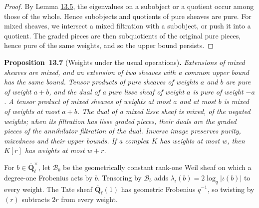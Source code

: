 \documentclass[11pt]{article}
\newenvironment{bpstatement}[2]{\par\addvspace{0.6\baselineskip}\noindent\textbf{#1}#2\textbf{.}\enspace\ignorespaces}
  {\par\addvspace{0.4\baselineskip}}
\newenvironment{bpstatementit}[2]{\begin{bpstatement}{#1}{#2}\itshape\ignorespaces}{\end{bpstatement}}
\begin{document}
\begin{proof}[{Proof}]\label{bp21}%
By Lemma \hyperref[bp17]{13.5}, the eigenvalues on a subobject or a quotient occur among those of the whole. Hence subobjects and quotients of pure sheaves are pure. For mixed sheaves, we intersect a mixed filtration with a subobject, or push it into a quotient. The graded pieces are then subquotients of the original pure pieces, hence pure of the same weights, and so the upper bound persists.
\end{proof}

\label{bp22}%
\begin{bpstatementit}{Proposition~13.7}{ (Weights under the usual operations)}
Extensions of mixed sheaves are mixed, and an extension of two sheaves with a common upper bound has the same bound.  Tensor products of pure sheaves of weights \(a\) and \(b\) are pure of weight \(a+b\), and the dual of a pure lisse sheaf of weight \(a\) is pure of weight \(-a\). A tensor product of mixed sheaves of weights at most \(a\) and at most \(b\) is mixed of weights at most \(a+b\). The dual of a mixed lisse sheaf is mixed, of the negated weights; when its filtration has lisse graded pieces, their duals are the graded pieces of the annihilator filtration of the dual.  Inverse image preserves purity, mixedness and their upper bounds.  If a complex \(K\) has weights at most \(w\), then \(K[r]\) has weights at most \(w+r\).

For \(b\in\overline{\mathbf Q}_\ell^\times\), let \(\mathcal B_b\) be the geometrically constant rank-one Weil sheaf on which a degree-one Frobenius acts by \(b\). Tensoring by \(\mathcal B_b\) adds \(\lambda_\iota(b)=2\log_q|\iota(b)|\) to every weight.  The Tate sheaf \(\overline{\mathbf Q}_\ell(1)\) has geometric Frobenius \(q^{-1}\), so twisting by \((r)\) subtracts \(2r\) from every weight.
\end{bpstatementit}
\end{document}
